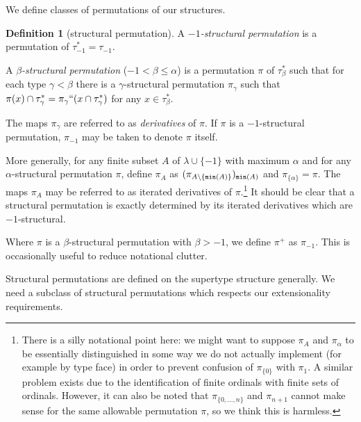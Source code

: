 \documentclass{article}
\theoremstyle{definition}
\newtheorem{definition}[theorem]{Definition}
\theoremstyle{remark}
\begin{document}
We define classes of permutations of our structures.
\begin{definition}[structural permutation]\label{def:structural_permutation}
A {\em $-1$-structural permutation\/} is a permutation of $\tau_{-1}^* = \tau_{-1}$.


A {\em $\beta$-structural permutation\/} ($-1 < \beta \leq \alpha$) is a permutation $\pi$ of $\tau_\beta^*$ such that for each type $\gamma<\beta$ there is a $\gamma$-structural permutation
$\pi_\gamma$ such that $\pi(x) \cap \tau^*_\gamma = \pi_\gamma``(x \cap \tau^*_\gamma)$ for any $x \in \tau^*_\beta$.

The maps $\pi_\gamma$ are referred to as {\em derivatives\/} of $\pi$.  {If $\pi$ is a $-1$-structural permutation, $\pi_{-1}$ may be taken to denote $\pi$ itself.}

More generally, for any finite subset $A$ of $\lambda \cup \{-1\}$ with maximum $\alpha$ {and for any $\alpha$-structural permutation $\pi$,}
define $\pi_A$ as $(\pi_{A \setminus \{{\tt min}(A)\}})_{{\tt min}(A)}$ {and $\pi_{\{\alpha\}} = \pi$}.  The maps $\pi_A$ may be referred to as iterated derivatives of $\pi$.\footnote{There is a silly notational point here:  we might want to suppose $\pi_A$ and $\pi_\alpha$ to be essentially distinguished in some way we do not actually implement (for example by type face) in order to prevent confusion of $\pi_{\{0\}}$ with $\pi_1$.  A similar problem exists due to the identification of finite ordinals with finite sets of ordinals.  However, it can also be noted that $\pi_{\{0,\ldots,n\}}$ and $\pi_{n+1}$ cannot make sense for the same allowable permutation $\pi$, so we think this is harmless.}  It should be clear that a structural permutation is exactly determined by its iterated derivatives which are $-1$-structural.

Where $\pi$ is a $\beta$-structural permutation with $\beta>-1$, we define $\pi^+$ as $\pi_{-1}$.  This is occasionally useful to reduce notational clutter.
\end{definition}



Structural permutations are defined on the supertype structure generally.  We need a subclass of structural permutations which respects our extensionality requirements.
\end{document}
